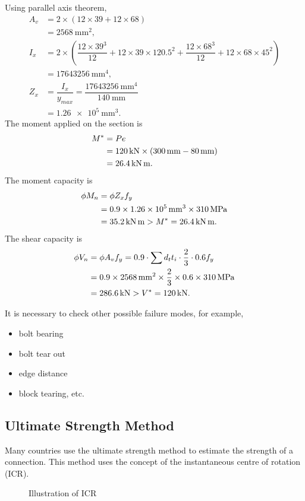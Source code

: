 \begin{solution}
\begin{figure}[H]

\end{figure}
Using parallel axis theorem,
\begin{align*}
A_v&=2\times\left(12\times39+12\times68\right)\\
&=\SI{2568}{\mm^2},\\
I_x&=2\times\left(\dfrac{12\times39^3}{12}+12\times39\times120.5^2+\dfrac{12\times68^3}{12}+12\times68\times45^2\right)\\
&=\SI{17643256}{\mm^4},\\
Z_x&=\dfrac{I_x}{y_{max}}=\dfrac{\SI{17643256}{\mm^4}}{\SI{140}{\mm}}\\&=\SI{1.26e5}{\mm^3}.
\end{align*}
The moment applied on the section is
\begin{align*}
M^*&=Pe\\&=\SI{120}{\kilo\newton}\times\left(\SI{300}{\milli\meter}-\SI{80}{\milli\meter}\right)\\&=\SI{26.4}{\kilo\newton\meter}.
\end{align*}
The moment capacity is
\begin{align*}
\phi{}M_n&=\phi{}Z_xf_y\\&=0.9\times\SI{1.26e5}{\milli\meter^3}\times\SI{310}{\mega\pascal}\\&=\SI{35.2}{\kilo\newton\meter}>M^*=\SI{26.4}{\kilo\newton\meter}.
\end{align*}
The shear capacity is
\begin{align*}
\phi{}V_n&=\phi{}A_vf_y=0.9\cdot\sum{}d_tt_i\cdot\dfrac{2}{3}\cdot0.6f_y\\
&=0.9\times\SI{2568}{\milli\meter^2}\times\dfrac{2}{3}\times0.6\times\SI{310}{\mega\pascal}\\
&=\SI{286.6}{\kilo\newton}>V^*=\SI{120}{\kilo\newton}.
\end{align*}

It is necessary to check other possible failure modes, for example,
\begin{itemize}
\item bolt bearing
\item bolt tear out
\item edge distance
\item block tearing, etc.
\end{itemize}
\end{solution}
\subsection{Ultimate Strength Method}
Many countries use the ultimate strength method to estimate the strength of a connection.
This method uses the concept of the instantaneous centre of rotation (ICR).
\begin{figure}[H]
\centering\caption{Illustration of ICR}
\end{figure}

